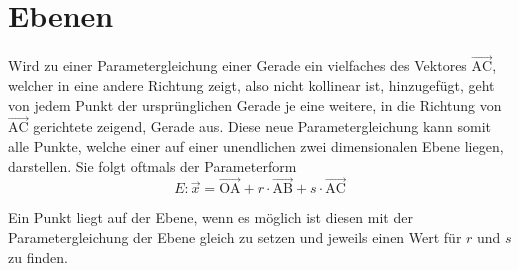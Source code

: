 \documentclass{article}
\begin{document}
 
\newcommand{\vect}[1]{\overrightarrow{#1}} 
\newcommand{\vectp}[1]{\vect{\mathrm{#1}}}
 
\noindent \begin{minipage}[t]{\dimexpr\textwidth-6cm}
 \vspace{0pt}  
 \section{Ebenen}
 Wird zu einer Parametergleichung einer Gerade ein vielfaches des Vektores $\vectp{AC}$, welcher in eine andere Richtung zeigt, also nicht kollinear ist, hinzugefügt, geht von jedem Punkt der ursprünglichen Gerade je eine weitere, in die Richtung von $\vectp{AC}$ gerichtete zeigend, Gerade aus.
 Diese neue Parametergleichung kann somit alle Punkte, welche einer auf einer unendlichen zwei dimensionalen Ebene liegen, darstellen. \newline
 Sie folgt oftmals der Parameterform  
 \[
  E: \vect{x} = \vectp{OA} + r \cdot \vectp{AB} + s \cdot \vectp{AC} 
 \]
\end{minipage}
\hfill
\begin{minipage}[t]{6cm}
  \centering
\end{minipage}
 
\vspace{1em}  
\noindent Ein Punkt liegt auf der Ebene, wenn es möglich ist diesen mit der Parametergleichung der Ebene gleich zu setzen und jeweils einen Wert für $r$ und $s$ zu finden.
 
\end{document}
